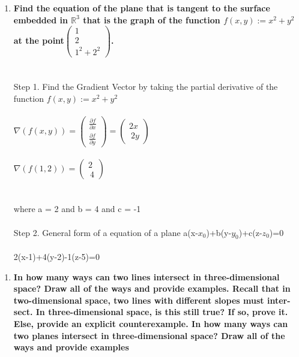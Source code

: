 \documentclass{article}
\begin{document}
\begin{enumerate}[8.]
	\item\textbf{Find the equation of the plane that is tangent to the surface embedded
	      in $\mathbb{R}^{3}$ that is the graph of the function $f(x,y):= x^{2}+y^{2}$ at the point$\left(\!\begin{array}{c}1 \\ 2\\  1^{2}+2^{2}\end{array} \!\right)$.}\\
	\\
	\\
	Step 1. Find the Gradient Vector by taking the partial derivative of the function $f(x,y):= x^{2}+y^{2}$\\
	\\
	$\nabla(f(x,y))= \left(\!\begin{array}{c}\frac{\partial f}{\partial x} \\\frac{\partial f}{\partial y}\end{array} \!\right)=\left(\!\begin{array}{c}2x \\\ 2y \end{array} \!\right)$\\
	\\
	$\nabla(f(1,2))=\left(\!\begin{array}{c}2 \\\ 4 \end{array} \!\right)$\\
	\\
	\\
	where a = 2 and b = 4 and c = -1
	\\
	\\
	Step 2. General form of a equation of a plane a(x-$x_{0}$)+b(y-$y_{0}$)+c(z-$z_{0}$)=0\\
	\\
	2(x-1)+4(y-2)-1(z-5)=0
\end{enumerate}
\begin{enumerate}[9.]
	\item\textbf{In how many ways can two lines intersect in three-dimensional space? Draw
	      all of the ways and provide examples.
	      Recall that in two-dimensional space, two lines with different slopes must inter-
	      sect. In three-dimensional space, is this still true? If so, prove it. Else, provide
	      an explicit counterexample.
	      In how many ways can two planes intersect in three-dimensional space? Draw
	all of the ways and provide examples}
\end{enumerate}
\end{document}
